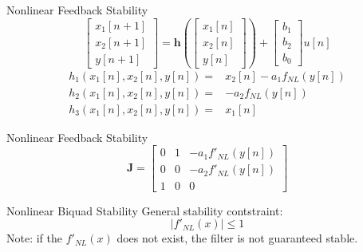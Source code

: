 \begin{frame}{Nonlinear Feedback Stability}
    \begin{equation}
        \begin{bmatrix} x_1[n+1] \\ x_2[n+1] \\ y[n+1] \end{bmatrix} =
        \mathbf{h} \left( \begin{bmatrix} x_1[n] \\ x_2[n] \\ y[n] \end{bmatrix}
        \right) + \begin{bmatrix} b_1\\ b_2\\ b_0 \end{bmatrix} u[n]
    \end{equation}
    \vspace{3ex}
    \begin{equation}
        \begin{split}
            h_1(x_1[n], x_2[n], y[n]) =& x_2[n] - a_1f_{NL}(y[n]) \\
            h_2(x_1[n], x_2[n], y[n]) =& -a_2f_{NL}(y[n]) \\
            h_3(x_1[n], x_2[n], y[n]) =& x_1[n]
        \end{split}
    \end{equation}
\end{frame}

\begin{frame}{Nonlinear Feedback Stability}
    \begin{equation}
        \mathbf{J} = \begin{bmatrix}
            0& 1& -a_1f'_{NL}(y[n]) \\
            0& 0& -a_2f'_{NL}(y[n]) \\
            1& 0& 0
        \end{bmatrix}
    \end{equation}
\end{frame}

\begin{frame}{Nonlinear Biquad Stability}
    General stability contstraint:
    \begin{equation}
        |f'_{NL}(x)| \leq 1
    \end{equation}
    \newline\newline
    \small
    Note: if the $f'_{NL}(x)$ does not exist, the filter is not guaranteed stable.
\end{frame}

